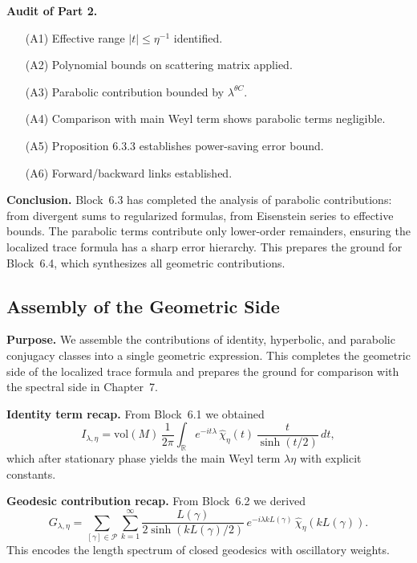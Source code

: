 \noindent\textbf{Audit of Part 2.}
\begin{itemize}
  \item[(A1)] Effective range $|t|\le \eta^{-1}$ identified.
  \item[(A2)] Polynomial bounds on scattering matrix applied.
  \item[(A3)] Parabolic contribution bounded by $\lambda^{\theta C}$.
  \item[(A4)] Comparison with main Weyl term shows parabolic terms negligible.
  \item[(A5)] Proposition 6.3.3 establishes power-saving error bound.
  \item[(A6)] Forward/backward links established.
\end{itemize}

\medskip

\noindent\textbf{Conclusion.}
Block~6.3 has completed the analysis of parabolic contributions:
from divergent sums to regularized formulas,
from Eisenstein series to effective bounds.
The parabolic terms contribute only lower-order remainders,
ensuring the localized trace formula has a sharp error hierarchy.
This prepares the ground for Block~6.4, which synthesizes all geometric contributions.



\subsection*{Assembly of the Geometric Side}

\noindent\textbf{Purpose.}
We assemble the contributions of identity, hyperbolic, and parabolic conjugacy classes into a single geometric expression.  
This completes the geometric side of the localized trace formula and prepares the ground for comparison with the spectral side in Chapter~7.

\medskip

\noindent\textbf{Identity term recap.}
From Block~6.1 we obtained
\[
  I_{\lambda,\eta}
  = \mathrm{vol}(M)\, \frac{1}{2\pi}\int_{\mathbb{R}} e^{-it\lambda}\,
  \widehat{\chi}_\eta(t)\,\frac{t}{\sinh(t/2)}\, dt,
\]
which after stationary phase yields the main Weyl term $\lambda\eta$ with explicit constants.

\medskip

\noindent\textbf{Geodesic contribution recap.}
From Block~6.2 we derived
\[
  G_{\lambda,\eta}
  = \sum_{[\gamma]\in \mathcal{P}} \sum_{k=1}^\infty
  \frac{L(\gamma)}{2\sinh(kL(\gamma)/2)}\,
  e^{-i\lambda kL(\gamma)}\, \widehat{\chi}_\eta(kL(\gamma)).
\]
This encodes the length spectrum of closed geodesics with oscillatory weights.

